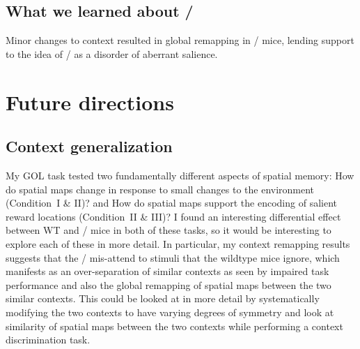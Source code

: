 
\subsection{What we learned about \scz/}

Minor changes to context resulted in global remapping in \df/ mice, lending support to the idea of \scz/ as a disorder of aberrant salience.


\section{Future directions}



\subsection{Context generalization}
My \ac{GOL} task tested two fundamentally different aspects of spatial memory: How do spatial maps change in response to small changes to the environment (Condition~I \& II)? and How do spatial maps support the encoding of salient reward locations (Condition~II \& III)?
I found an interesting differential effect between WT and \df/ mice in both of these tasks, so it would be interesting to explore each of these in more detail.
In particular, my context remapping results suggests that the \df/ mis-attend to stimuli that the wildtype mice ignore, which manifests as an over-separation of similar contexts as seen by impaired task performance and also the global remapping of spatial maps between the two similar contexts.
This could be looked at in more detail by systematically modifying the two contexts to have varying degrees of symmetry and look at similarity of spatial maps between the two contexts while performing a context discrimination task.

